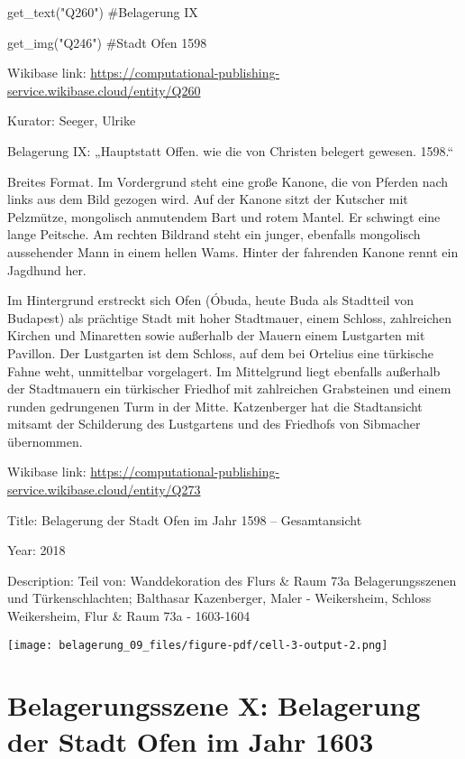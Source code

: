\documentclass[
  a4paper,
  portrait]{book}
\newenvironment{Shaded}{\begin{snugshade}}{\end{snugshade}}
\newcommand{\CommentTok}[1]{\textcolor[rgb]{0.37,0.37,0.37}{#1}}
\newcommand{\NormalTok}[1]{\textcolor[rgb]{0.00,0.23,0.31}{#1}}
\newcommand{\StringTok}[1]{\textcolor[rgb]{0.13,0.47,0.30}{#1}}
\begin{document}
\begin{Shaded}
\begin{Highlighting}[]
\NormalTok{get\_text(}\StringTok{"Q260"}\NormalTok{)}
\CommentTok{\#Belagerung IX}

\NormalTok{get\_img(}\StringTok{"Q246"}\NormalTok{)}
\CommentTok{\#Stadt Ofen 1598}
\end{Highlighting}
\end{Shaded}

Wikibase link:
\url{https://computational-publishing-service.wikibase.cloud/entity/Q260}

Kurator: Seeger, Ulrike

Belagerung IX: „Hauptstatt Offen. wie die von Christen belegert gewesen.
1598.``

Breites Format. Im Vordergrund steht eine große Kanone, die von Pferden
nach links aus dem Bild gezogen wird. Auf der Kanone sitzt der Kutscher
mit Pelzmütze, mongolisch anmutendem Bart und rotem Mantel. Er schwingt
eine lange Peitsche. Am rechten Bildrand steht ein junger, ebenfalls
mongolisch aussehender Mann in einem hellen Wams. Hinter der fahrenden
Kanone rennt ein Jagdhund her.

Im Hintergrund erstreckt sich Ofen (Óbuda, heute Buda als Stadtteil von
Budapest) als prächtige Stadt mit hoher Stadtmauer, einem Schloss,
zahlreichen Kirchen und Minaretten sowie außerhalb der Mauern einem
Lustgarten mit Pavillon. Der Lustgarten ist dem Schloss, auf dem bei
Ortelius eine türkische Fahne weht, unmittelbar vorgelagert. Im
Mittelgrund liegt ebenfalls außerhalb der Stadtmauern ein türkischer
Friedhof mit zahlreichen Grabsteinen und einem runden gedrungenen Turm
in der Mitte. Katzenberger hat die Stadtansicht mitsamt der Schilderung
des Lustgartens und des Friedhofs von Sibmacher übernommen.

Wikibase link:
\url{https://computational-publishing-service.wikibase.cloud/entity/Q273}

Title: Belagerung der Stadt Ofen im Jahr 1598 -- Gesamtansicht

Year: 2018

Description: Teil von: Wanddekoration des Flurs \& Raum 73a
Belagerungsszenen und Türkenschlachten; Balthasar Kazenberger, Maler -
Weikersheim, Schloss Weikersheim, Flur \& Raum 73a - 1603-1604

\texttt{[image: belagerung\_09\_files/figure-pdf/cell-3-output-2.png]}

\chapter{Belagerungsszene X: Belagerung der Stadt Ofen im Jahr
1603}\label{belagerungsszene-x-belagerung-der-stadt-ofen-im-jahr-1603}
\end{document}
